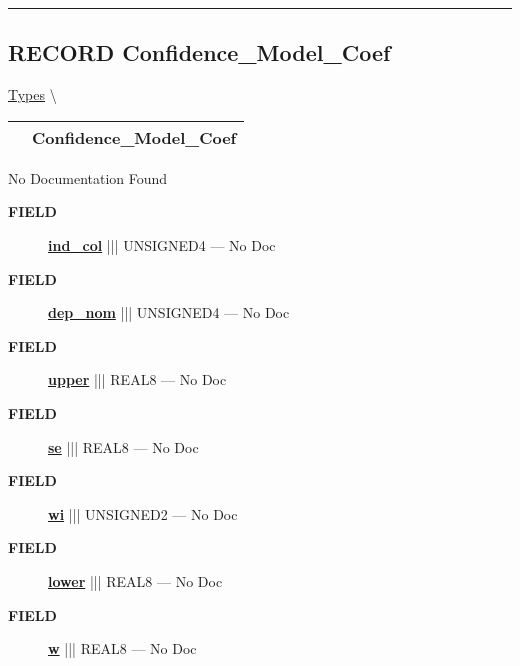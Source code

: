 \rule{\linewidth}{0.5pt}
\subsection*{\textsf{\colorbox{headtoc}{\color{white} RECORD}
Confidence\_Model\_Coef}}

\hypertarget{ecldoc:logisticregression.types.confidence_model_coef}{}
\hspace{0pt} \hyperlink{ecldoc:LogisticRegression.Types}{Types} \textbackslash 

{\renewcommand{\arraystretch}{1.5}
\begin{tabularx}{\textwidth}{|>{\raggedright\arraybackslash}l|X|}
\hline
\hspace{0pt}\mytexttt{\color{red} } & \textbf{Confidence\_Model\_Coef} \\
\hline
\end{tabularx}
}

\par





No Documentation Found







\par
\begin{description}
\item [\colorbox{tagtype}{\color{white} \textbf{\textsf{FIELD}}}] \textbf{\underline{ind\_col}} ||| UNSIGNED4 --- No Doc
\item [\colorbox{tagtype}{\color{white} \textbf{\textsf{FIELD}}}] \textbf{\underline{dep\_nom}} ||| UNSIGNED4 --- No Doc
\item [\colorbox{tagtype}{\color{white} \textbf{\textsf{FIELD}}}] \textbf{\underline{upper}} ||| REAL8 --- No Doc
\item [\colorbox{tagtype}{\color{white} \textbf{\textsf{FIELD}}}] \textbf{\underline{se}} ||| REAL8 --- No Doc
\item [\colorbox{tagtype}{\color{white} \textbf{\textsf{FIELD}}}] \textbf{\underline{wi}} ||| UNSIGNED2 --- No Doc
\item [\colorbox{tagtype}{\color{white} \textbf{\textsf{FIELD}}}] \textbf{\underline{lower}} ||| REAL8 --- No Doc
\item [\colorbox{tagtype}{\color{white} \textbf{\textsf{FIELD}}}] \textbf{\underline{w}} ||| REAL8 --- No Doc
\end{description}





